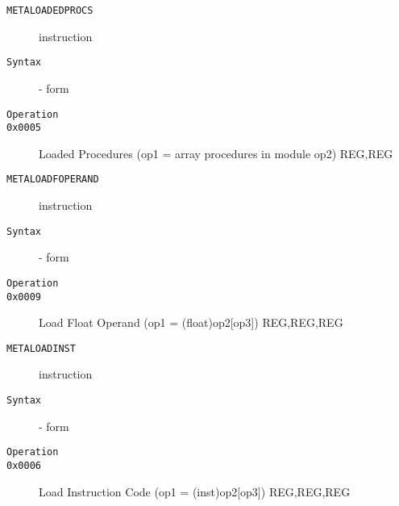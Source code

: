 \clearpage
\begin{description}
\item[\texttt{METALOADEDPROCS}] instruction\\
\item[\texttt{Syntax}] - form \\

\item[\texttt{Operation}]
\item[\texttt{}]
\item[\texttt{0x0005}]      Loaded Procedures (op1 = array procedures in module op2)  {REG,REG}      \\
\end{description}
\clearpage
\begin{description}
\item[\texttt{METALOADFOPERAND}] instruction\\
\item[\texttt{Syntax}] - form \\

\item[\texttt{Operation}]
\item[\texttt{}]
\item[\texttt{0x0009}]       Load Float Operand (op1 = (float)op2[op3])  {REG,REG,REG} \\
\end{description}
\clearpage
\begin{description}
\item[\texttt{METALOADINST}] instruction\\
\item[\texttt{Syntax}] - form \\

\item[\texttt{Operation}]
\item[\texttt{}]
\item[\texttt{0x0006}]   Load Instruction Code (op1 = (inst)op2[op3])  {REG,REG,REG}     \\
\end{description}
